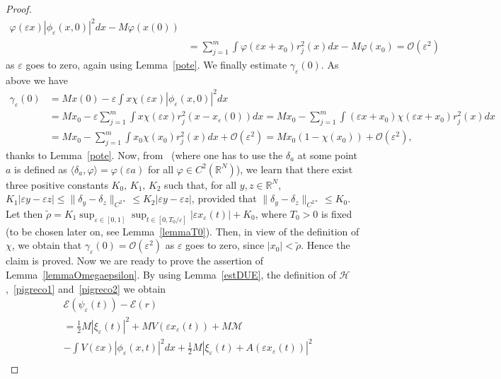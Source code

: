 \documentclass[11pt]{amsart}
\numberwithin{equation}{section}
\theoremstyle{definition}
\begin{document}
\begin{proof}
$$\begin{aligned}
\varphi({\varepsilon} x)|\phi_{\varepsilon}(x,0)|^2dx-M\varphi(x(0))\\
& = \sum_{j=1}^{m}\int \varphi({\varepsilon} x+x_0)
r_j^2(x)dx-M\varphi(x_0)=\mathcal O ({\varepsilon}^2)
\end{aligned}$$
as ${\varepsilon}$ goes to zero, again using Lemma~\ref{pote}. We finally
estimate $\gamma_{\varepsilon}(0)$. As above we have
$$
\begin{aligned}
\gamma_{\varepsilon}(0)& =Mx(0)-{\varepsilon} \int
x\chi({\varepsilon} x)|\phi_{\varepsilon}(x,0)|^{2}dx\\
& = Mx_0-{\varepsilon} \sum_{j=1}^{m}\int
x\chi({\varepsilon} x)r_j^2(x-x_{\varepsilon}(0))dx
 = Mx_0-\sum_{j=1}^{m}\int
( {\varepsilon} x+x_0)\chi({\varepsilon} x+x_0)r_j^2(x)dx\\
& = Mx_0-\sum_{j=1}^{m}\int
x_0\chi(x_0)r_j^2(x)dx+\mathcal O ({\varepsilon}^2)
 = Mx_0\left(1-\chi(x_0)\right)+\mathcal O ({\varepsilon}^2),
\end{aligned}
$$
thanks to Lemma~\ref{pote}.
Now, from~\cite[Lemma 3.1-3.2]{Keerani2} (where one has to use
the $\delta_a$ at some point $a$ is defined as $\langle \delta_a,\varphi\rangle=\varphi({\varepsilon} a)$
for all $\varphi\in C^2({{\mathbb R}}^N)$), we learn that
there exist three positive constants $K_{0},\,K_{1},\,K_{2}$ such
that, for all $y,z\in{{\mathbb R}}^N$,
$K_{1}|{\varepsilon} y-{\varepsilon} z|\leq \|\delta_{y}-\delta_{z}\|_{C^{2*}}\leq K_{2}|{\varepsilon} y-{\varepsilon} z|$,
provided that $\|\delta_{y}-\delta_{z}\|_{C^{2*}}\leq K_{0}$.
Let then $\tilde \rho=K_1\sup_{{\varepsilon}\in[0,1]}\sup_{t\in [0,
T_0/{\varepsilon}]}|{\varepsilon} x_{\varepsilon}(t)|+K_0$, where $T_0>0$ is fixed (to be chosen later
on, see Lemma~\ref{lemmaT0}).
Then, in view of the definition of $\chi$, we obtain that
$\gamma_{\varepsilon}(0)=\mathcal O({\varepsilon}^2)$ as ${\varepsilon}$ goes to zero, since
$|x_0|<\tilde\rho$. Hence the claim is proved.
\vskip4pt
\noindent
Now we are ready to prove the assertion of
Lemma~\ref{lemmaOmegaepsilon}. By using Lemma~\ref{estDUE}, the
definition of $\mathcal H$,~\eqref{pigreco1} and~\eqref{pigreco2} we obtain
\begin{align*}
& \mathcal E(\psi_{\varepsilon}(t)) -\mathcal E(r) \\
& = \frac 1 2M |\xi_{\varepsilon}(t)|^2+MV({\varepsilon} x_{\varepsilon}(t))+M{\mathcal M} \\
&-\int V({\varepsilon}
x)|\phi_{\varepsilon}(x,t)|^{2}dx
+\frac12 M|\xi_{\varepsilon}(t)+A({\varepsilon} x_{\varepsilon}(t))|^2 \\

\end{align*}
\end{proof}
\end{document}
